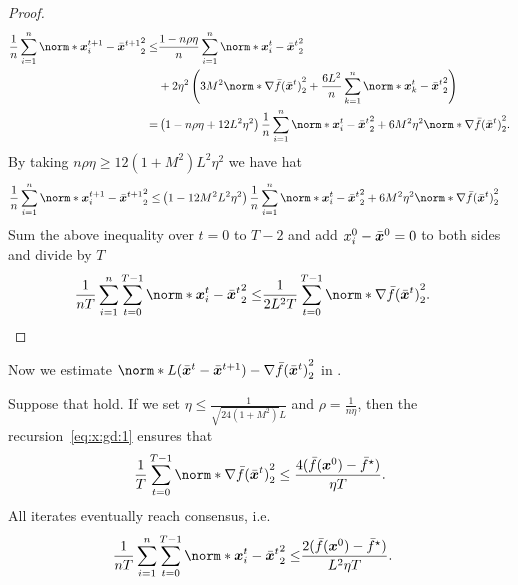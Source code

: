 \documentclass{article}
\begin{document}
\begin{proof}
\begin{align*}
    \frac{1}{n}\sum_{i=1}^n \norm*{\xx_i^{t+1} - \bar{\xx}^{t+1}}_2^2
    \le& \frac{1-n\rho\eta}{n}\sum_{i=1}^n \norm*{\xx_i^{t} - \bar{\xx}^{t}}_2^2 \\
    &+ 2\eta^2 \left(
      3M^2 \norm*{\nabla \bar{f}(\bar{\xx}^t) }_2^2 + \frac{6L^2}{n} \sum_{k=1}^n \norm*{\xx_k^t - \bar{\xx}^t}_2^2
    \right) \\
    =& \left(1-n\rho\eta+ 12L^2\eta^2 \right) \frac{1}{n}\sum_{i=1}^n \norm*{\xx_i^{t} - \bar{\xx}^{t}}_2^2
    + 6M^2\eta^2 \norm*{\nabla \bar{f}(\bar{\xx}^t) }_2^2.
  \end{align*}
  By taking $n\rho\eta\ge 12 (1+M^2) L^2\eta^2$ we have hat
  \begin{align*}
    \frac{1}{n}\sum_{i=1}^n \norm*{\xx_i^{t+1} - \bar{\xx}^{t+1}}_2^2
    \le& \left(1-12M^2L^2\eta^2\right) \frac{1}{n}\sum_{i=1}^n \norm*{\xx_i^{t} - \bar{\xx}^{t}}_2^2
    + 6M^2\eta^2 \norm*{\nabla \bar{f}(\bar{\xx}^t) }_2^2
  \end{align*}
  Sum the above inequality over $t=0$ to $T-2$ and add $x_i^0-\bar{\bm{x}}^0=0$ to both sides and divide by $T$
  \begin{align*}
    \frac{1}{nT}\sum_{i=1}^n\sum_{t=0}^{T-1} \norm*{\xx_i^{t} - \bar{\xx}^{t}}_2^2
    \le& \frac{1}{2L^2T} \sum_{t=0}^{T-1} \norm*{\nabla \bar{f}(\bar{\xx}^t) }_2^2.
  \end{align*}
\end{proof}
Now we estimate $\norm*{L(\bar{\xx}^{t}-\bar{\xx}^{t+1}) - \nabla \bar{f}(\bar{\xx}^{t})}_2^2$ in .
\begin{theorem}
  Suppose that  hold. If we set $\eta\le \frac{1}{\sqrt{24(1+M^2)}L}$ and $\rho=\frac{1}{n\eta}$, then the recursion~\eqref{eq:x:gd:1} ensures that
  \begin{align*}
    \frac{1}{T} \sum_{t=0}^{T-1} \norm*{\nabla \bar{f}(\bar{\xx}^{t})}_2^2
    \le \frac{4(\bar{f}(\xx^{0}) - \bar{f}^\star)}{\eta T}.
  \end{align*}
  All iterates eventually reach consensus, i.e.
  \begin{align*}
    \frac{1}{nT}\sum_{i=1}^n\sum_{t=0}^{T-1} \norm*{\xx_i^{t} - \bar{\xx}^{t}}_2^2
    \le&  \frac{2(\bar{f}(\xx^{0}) - \bar{f}^\star)}{L^2\eta T}.
  \end{align*}
\end{theorem}
\end{document}
